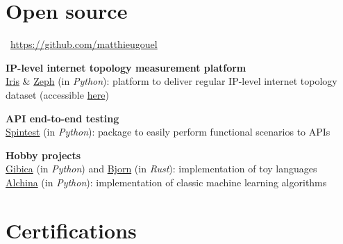 \documentclass[11pt,a4paper,sans]{moderncv} %
\begin{document}

\section{Open source}

\faGithub~\href{https://github.com/matthieugouel}{https://github.com/matthieugouel}
\vspace{+0.25cm}

\textbf{IP-level internet topology measurement platform}\\
\href{https://github.com/dioptra-io/iris}{Iris} \& \href{https://github.com/dioptra-io/zeph}{Zeph} (in \emph{Python}): platform to deliver regular IP-level internet topology dataset (accessible \href{https://iris.dioptra.io/#/}{here})

\vspace{+0.25cm}
\textbf{API end-to-end testing}\\
\href{https://github.com/societe-generale/spintest}{Spintest} (in \emph{Python}): package to easily perform functional scenarios to APIs

\vspace{+0.25cm}
\textbf{Hobby projects}\\
\href{https://github.com/matthieugouel/gibica}{Gibica} (in \emph{Python}) and \href{https://github.com/matthieugouel/bjorn}{Bjorn} (in \emph{Rust}): implementation of toy languages\\
\href{https://github.com/matthieugouel/alchina}{Alchina} (in \emph{Python}): implementation of classic machine learning algorithms


\section{Certifications}

\end{document}
